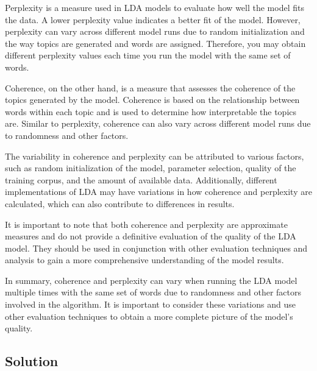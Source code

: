 \documentclass[10pt]{article} %
\begin{document}
	Perplexity is a measure used in LDA models to evaluate how well the model fits the data. A lower perplexity value indicates a better fit of the model. However, perplexity can vary across different model runs due to random initialization and the way topics are generated and words are assigned. Therefore, you may obtain different perplexity values each time you run the model with the same set of words.
	
	Coherence, on the other hand, is a measure that assesses the coherence of the topics generated by the model. Coherence is based on the relationship between words within each topic and is used to determine how interpretable the topics are. Similar to perplexity, coherence can also vary across different model runs due to randomness and other factors.
	
	The variability in coherence and perplexity can be attributed to various factors, such as random initialization of the model, parameter selection, quality of the training corpus, and the amount of available data. Additionally, different implementations of LDA may have variations in how coherence and perplexity are calculated, which can also contribute to differences in results.
	
	It is important to note that both coherence and perplexity are approximate measures and do not provide a definitive evaluation of the quality of the LDA model. They should be used in conjunction with other evaluation techniques and analysis to gain a more comprehensive understanding of the model results.
	
	In summary, coherence and perplexity can vary when running the LDA model multiple times with the same set of words due to randomness and other factors involved in the algorithm. It is important to consider these variations and use other evaluation techniques to obtain a more complete picture of the model's quality.
	

	
	\subsection{Solution}
	
\end{document}
